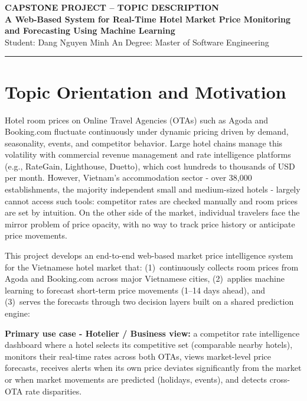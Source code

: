 \documentclass[11pt,a4paper]{article}
\newcommand{\entry}[1]{\par\hspace*{1.5em}#1}
\begin{document}
\begin{center}
    {\large \textbf{CAPSTONE PROJECT -- TOPIC DESCRIPTION}}\\[4pt]
    {\large \textbf{A Web-Based System for Real-Time Hotel Market Price
    Monitoring and Forecasting Using Machine Learning}}\\[6pt]
    Student: Dang Nguyen Minh An \hfill Degree: Master of Software Engineering
\end{center}

\vspace{-2pt}
\hrule
\vspace{6pt}

\section{Topic Orientation and Motivation}
Hotel room prices on Online Travel Agencies (OTAs) such as Agoda and
Booking.com fluctuate continuously under dynamic pricing driven by demand,
seasonality, events, and competitor behavior. Large hotel chains manage this
volatility with commercial revenue management and rate intelligence platforms
(e.g., RateGain, Lighthouse, Duetto), which cost hundreds to thousands of USD
per month. However, Vietnam's accommodation sector - over 38{,}000
establishments, the majority independent small and medium-sized hotels -
largely cannot access such tools: competitor rates are checked manually and
room prices are set by intuition. On the other side of the market, individual
travelers face the mirror problem of price opacity, with no way to track
price history or anticipate price movements.

This project develops an end-to-end web-based market price intelligence
system for the Vietnamese hotel market that: (1)~continuously collects room
prices from Agoda and Booking.com across major Vietnamese cities,
(2)~applies machine learning to forecast short-term price movements (1--14
days ahead), and (3)~serves the forecasts through two decision layers built
on a shared prediction engine:

\entry{\textbf{Primary use case - Hotelier / Business view:} a competitor
rate intelligence dashboard where a hotel selects its competitive set
(comparable nearby hotels), monitors their real-time rates across both OTAs,
views market-level price forecasts, receives alerts when its own price
deviates significantly from the market or when market movements are
predicted (holidays, events), and detects cross-OTA rate disparities.}
\end{document}
